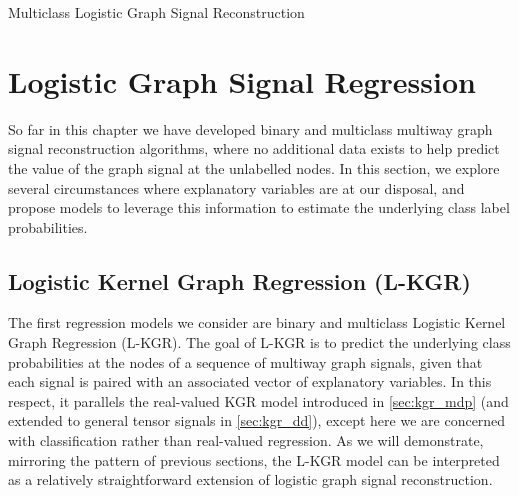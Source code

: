 \begin{algorithm}[ht]
\begin{algorithmic}
    \vspace{0.15cm}
    \vspace{0.15cm}
    \vspace{0.15cm}
    \vspace{0.15cm}
    \EndWhile
    \vspace{0.25cm}
    \vspace{0.15cm}
    \end{algorithmic}
    \caption{Multiclass Logistic Graph Signal Reconstruction}
    \label{al:LGSR_mc}
\end{algorithm}

\section{Logistic Graph Signal Regression} 

\label{sec:logistic_regression}

So far in this chapter we have developed binary and multiclass multiway graph signal reconstruction algorithms, where no additional data exists to help predict the value of the graph signal at the unlabelled nodes. In this section, we explore several circumstances where explanatory variables are at our disposal, and propose models to leverage this information to estimate the underlying class label probabilities.

\subsection{Logistic Kernel Graph Regression (L-KGR)}

\label{sec:lkgr}

The first regression models we consider are binary and multiclass Logistic Kernel Graph Regression (L-KGR). The goal of L-KGR is to predict the underlying class probabilities at the nodes of a sequence of multiway graph signals, given that each signal is paired with an associated vector of explanatory variables. In this respect, it parallels the real-valued KGR model introduced in \cref{sec:kgr_mdp} (and extended to general tensor signals in \cref{sec:kgr_dd}), except here we are concerned with classification rather than real-valued regression. As we will demonstrate, mirroring the pattern of previous sections, the L-KGR model can be interpreted as a relatively straightforward extension of logistic graph signal reconstruction. 


